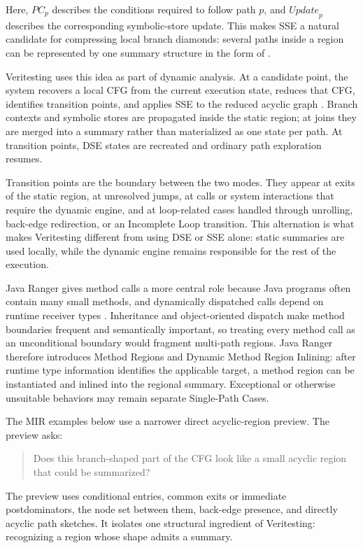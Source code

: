 \documentclass[conference]{IEEEtran}
\begin{document}
Here, \(PC_p\) describes the conditions required to follow path \(p\), and
\(\mathit{Update}_p\) describes the corresponding symbolic-store update. This makes SSE
a natural candidate for compressing local branch diamonds: several paths inside
a region can be represented by one summary structure in the form of
.

Veritesting uses this idea as part of dynamic analysis. At a candidate point,
the system recovers a local CFG from the current execution state, reduces that
CFG, identifies transition points, and applies SSE to the reduced acyclic
graph \cite{veritesting}. Branch contexts and symbolic stores are propagated
inside the static region; at joins they are merged into a summary rather than
materialized as one state per path. At transition points, DSE states are
recreated and ordinary path exploration resumes.

Transition points are the boundary between the two modes. They appear at exits
of the static region, at unresolved jumps, at calls or system interactions
that require the dynamic engine, and at loop-related cases handled through
unrolling, back-edge redirection, or an Incomplete Loop transition. This
alternation is what makes Veritesting different from using DSE or SSE alone:
static summaries are used locally, while the dynamic engine remains responsible
for the rest of the execution.

Java Ranger gives method calls a more central role because Java programs often
contain many small methods, and dynamically dispatched calls depend on runtime
receiver types \cite{java-ranger}. Inheritance and object-oriented dispatch
make method boundaries frequent and semantically important, so treating every
method call as an unconditional boundary would fragment multi-path regions.
Java Ranger therefore introduces Method Regions and Dynamic Method Region
Inlining: after runtime type information identifies the applicable target, a
method region can be instantiated and inlined into the regional summary.
Exceptional or otherwise unsuitable behaviors may remain separate Single-Path
Cases.

The MIR examples below use a narrower direct acyclic-region preview. The
preview asks:

\begin{quote}
Does this branch-shaped part of the CFG look like a small acyclic region that
could be summarized?
\end{quote}

The preview uses conditional entries, common exits or immediate
postdominators, the node set between them, back-edge presence, and directly
acyclic path sketches. It isolates one structural ingredient of Veritesting:
recognizing a region whose shape admits a summary.
\end{document}
